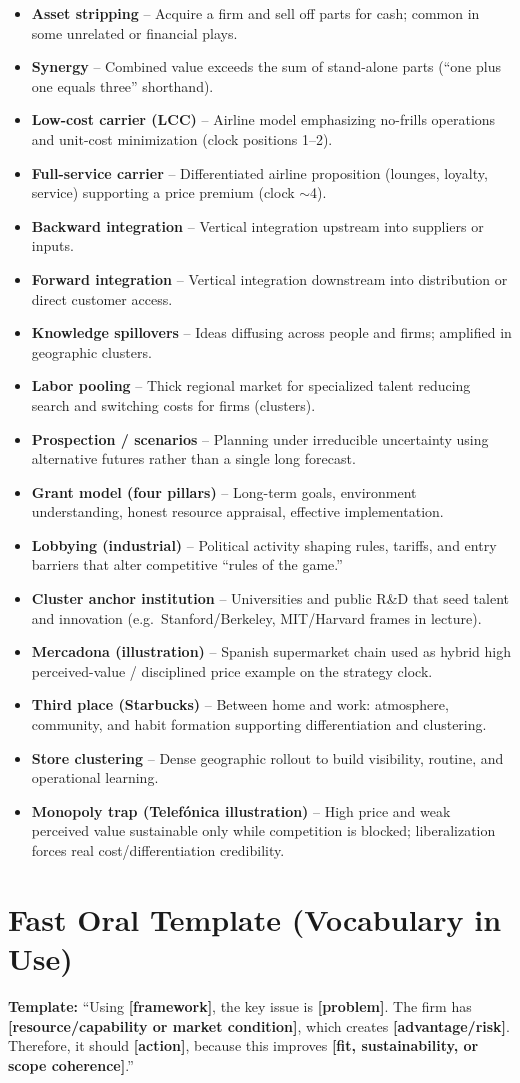 \documentclass[10pt,a4paper]{article}
\newcommand{\vocab}[2]{\item \textbf{\textcolor{pinkmain}{#1}} -- #2}
\begin{document}
\begin{itemize}
\vocab{Asset stripping}{Acquire a firm and sell off parts for cash; common in some unrelated or financial plays.}
\vocab{Synergy}{Combined value exceeds the sum of stand-alone parts (``one plus one equals three'' shorthand).}
\vocab{Low-cost carrier (LCC)}{Airline model emphasizing no-frills operations and unit-cost minimization (clock positions 1--2).}
\vocab{Full-service carrier}{Differentiated airline proposition (lounges, loyalty, service) supporting a price premium (clock $\sim$4).}
\vocab{Backward integration}{Vertical integration upstream into suppliers or inputs.}
\vocab{Forward integration}{Vertical integration downstream into distribution or direct customer access.}
\vocab{Knowledge spillovers}{Ideas diffusing across people and firms; amplified in geographic clusters.}
\vocab{Labor pooling}{Thick regional market for specialized talent reducing search and switching costs for firms (clusters).}
\vocab{Prospection / scenarios}{Planning under irreducible uncertainty using alternative futures rather than a single long forecast.}
\vocab{Grant model (four pillars)}{Long-term goals, environment understanding, honest resource appraisal, effective implementation.}
\vocab{Lobbying (industrial)}{Political activity shaping rules, tariffs, and entry barriers that alter competitive ``rules of the game.''}
\vocab{Cluster anchor institution}{Universities and public R\&D that seed talent and innovation (e.g.\ Stanford/Berkeley, MIT/Harvard frames in lecture).}
\vocab{Mercadona (illustration)}{Spanish supermarket chain used as hybrid high perceived-value / disciplined price example on the strategy clock.}
\vocab{Third place (Starbucks)}{Between home and work: atmosphere, community, and habit formation supporting differentiation and clustering.}
\vocab{Store clustering}{Dense geographic rollout to build visibility, routine, and operational learning.}
\vocab{Monopoly trap (Telefónica illustration)}{High price and weak perceived value sustainable only while competition is blocked; liberalization forces real cost/differentiation credibility.}
\end{itemize}

\section*{Fast Oral Template (Vocabulary in Use)}
\colorbox{pinksoft}{\parbox{\dimexpr\linewidth-2\fboxsep}{\small
\textbf{Template:} ``Using \textbf{[framework]}, the key issue is \textbf{[problem]}. The firm has \textbf{[resource/capability or market condition]}, which creates \textbf{[advantage/risk]}. Therefore, it should \textbf{[action]}, because this improves \textbf{[fit, sustainability, or scope coherence]}.''}}
\end{document}
